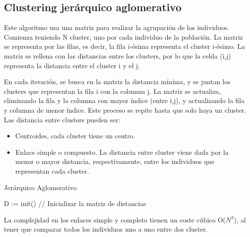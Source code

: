 	\subsection{Clustering jerárquico aglomerativo}

		Este algoritmo usa una matriz para realizar la agrupación de los individuos. Comienza teniendo N cluster, uno por cada individuo de la población. La matriz se representa por las filas, es decir, la fila i-ésima representa el cluster i-ésimo. La matriz se rellena con las distancias entre los clusters, por lo que la celda (i,j) representa la distancia entre el cluster i y el j.  
		
		En cada iteración, se busca en la matriz la distancia mínima, y se juntan los clusters que representan la fila i con la columna j. La matriz se actualiza, eliminando la fila y la columna con mayor índice (entre i,j), y actualizando la fila y columna de menor índice. Este proceso se repite hasta que solo haya un cluster. Las distancia entre clusters pueden ser:
		\begin{itemize}
		\item Centroides, cada cluster tiene un centro.
		\item Enlace simple o compuesto. La distancia entre cluster viene dada por la menor o mayor distancia, respectivamente, entre los individuos que representan cada cluster.
		\end{itemize}



		\begin{algorithm}[!h]
			\caption{Jerárquico Aglomerativo}
			D := init() // Inicializar la matriz de distancias\\
			
		\end{algorithm}

		\noindent La complejidad en los enlaces simple y completo tienen un coste cúbico O(\(N^{3}\)), al tener que comparar todos los individuos uno a uno entre dos cluster.
		
